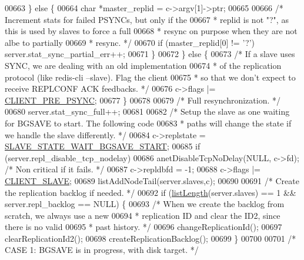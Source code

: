\begin{DoxyCode}
{{{{{{{{{{{{{{{{{{{{{{{{{{{{{{00663         \} \textcolor{keywordflow}{else} \{
00664             \textcolor{keywordtype}{char} *master\_replid = c->argv[1]->ptr;
00665 
00666             \textcolor{comment}{/* Increment stats for failed PSYNCs, but only if the}
00667 \textcolor{comment}{             * replid is not "?", as this is used by slaves to force a full}
00668 \textcolor{comment}{             * resync on purpose when they are not albe to partially}
00669 \textcolor{comment}{             * resync. */}
00670             \textcolor{keywordflow}{if} (master\_replid[0] != \textcolor{stringliteral}{'?'}) server.stat\_sync\_partial\_err++;
00671         \}
00672     \} \textcolor{keywordflow}{else} \{
00673         \textcolor{comment}{/* If a slave uses SYNC, we are dealing with an old implementation}
00674 \textcolor{comment}{         * of the replication protocol (like redis-cli --slave). Flag the client}
00675 \textcolor{comment}{         * so that we don't expect to receive REPLCONF ACK feedbacks. */}
00676         c->flags |= \hyperlink{server_8h_ac13d62411270bd658f6d82e711e0f912}{CLIENT\_PRE\_PSYNC};
00677     \}
00678 
00679     \textcolor{comment}{/* Full resynchronization. */}
00680     server.stat\_sync\_full++;
00681 
00682     \textcolor{comment}{/* Setup the slave as one waiting for BGSAVE to start. The following code}
00683 \textcolor{comment}{     * paths will change the state if we handle the slave differently. */}
00684     c->replstate = \hyperlink{server_8h_a170ee2dd8cfefaf0d112edcc3152f8d7}{SLAVE\_STATE\_WAIT\_BGSAVE\_START};
00685     \textcolor{keywordflow}{if} (server.repl\_disable\_tcp\_nodelay)
00686         anetDisableTcpNoDelay(NULL, c->fd); \textcolor{comment}{/* Non critical if it fails. */}
00687     c->repldbfd = -1;
00688     c->flags |= \hyperlink{server_8h_ae9f6995948253652bc9454d79a72f4a7}{CLIENT\_SLAVE};
00689     listAddNodeTail(server.slaves,c);
00690 
00691     \textcolor{comment}{/* Create the replication backlog if needed. */}
00692     \textcolor{keywordflow}{if} (\hyperlink{adlist_8h_afde0ab079f934670e82119b43120e94b}{listLength}(server.slaves) == 1 && server.repl\_backlog == NULL) \{
00693         \textcolor{comment}{/* When we create the backlog from scratch, we always use a new}
00694 \textcolor{comment}{         * replication ID and clear the ID2, since there is no valid}
00695 \textcolor{comment}{         * past history. */}
00696         changeReplicationId();
00697         clearReplicationId2();
00698         createReplicationBacklog();
00699     \}
00700 
00701     \textcolor{comment}{/* CASE 1: BGSAVE is in progress, with disk target. */}
}}}}}}}}}}}}}}}}}}}}}}}}}}}}}}
\end{DoxyCode}
